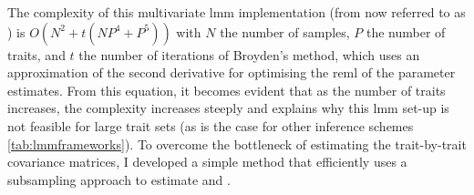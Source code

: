 The complexity of this multivariate \gls{lmm} implementation (from now referred to as ) is \(O(N^2 + t(NP^4 + P^5))\) with \(N\) the number of samples, \(P\) the number of traits, and \(t\) the number of iterations of Broyden's method, which uses an approximation of the second derivative for optimising the \gls{reml} of the parameter estimates. From this equation, it becomes evident that as the number of traits increases, the complexity increases steeply and explains why this \gls{lmm} set-up is not feasible for large trait sets (as is the case for other inference schemes \cref{tab:lmmframeworks}). To overcome the bottleneck of estimating the trait-by-trait covariance matrices, I developed a simple method that efficiently uses a subsampling approach to estimate  and .